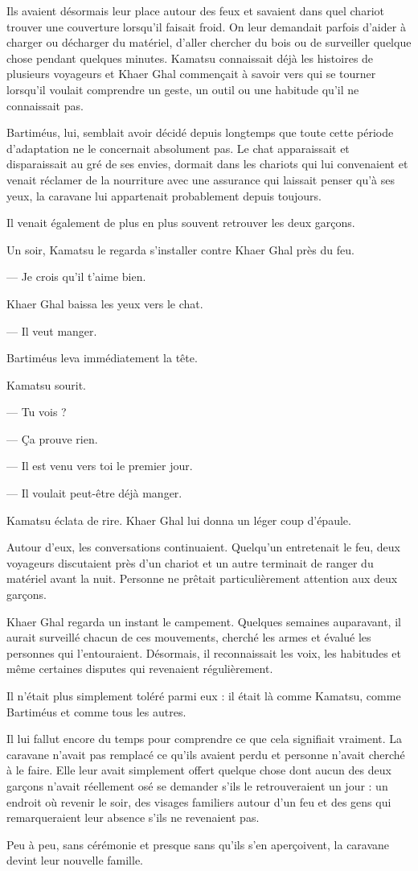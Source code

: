 Ils avaient désormais leur place autour des feux et savaient dans quel chariot
trouver une couverture lorsqu'il faisait froid. On leur demandait parfois
d'aider à charger ou décharger du matériel, d'aller chercher du bois ou de
surveiller quelque chose pendant quelques minutes. Kamatsu connaissait déjà
les histoires de plusieurs voyageurs et Khaer Ghal commençait à savoir vers
qui se tourner lorsqu'il voulait comprendre un geste, un outil ou une habitude
qu'il ne connaissait pas.

Bartiméus, lui, semblait avoir décidé depuis longtemps que toute cette période
d'adaptation ne le concernait absolument pas. Le chat apparaissait et
disparaissait au gré de ses envies, dormait dans les chariots qui lui
convenaient et venait réclamer de la nourriture avec une assurance qui
laissait penser qu'à ses yeux, la caravane lui appartenait probablement depuis
toujours.

Il venait également de plus en plus souvent retrouver les deux garçons.

Un soir, Kamatsu le regarda s'installer contre Khaer Ghal près du feu.

— Je crois qu'il t'aime bien.

Khaer Ghal baissa les yeux vers le chat.

— Il veut manger.

Bartiméus leva immédiatement la tête.

Kamatsu sourit.

— Tu vois ?

— Ça prouve rien.

— Il est venu vers toi le premier jour.

— Il voulait peut-être déjà manger.

Kamatsu éclata de rire. Khaer Ghal lui donna un léger coup d'épaule.

Autour d'eux, les conversations continuaient. Quelqu'un entretenait le feu,
deux voyageurs discutaient près d'un chariot et un autre terminait de ranger
du matériel avant la nuit. Personne ne prêtait particulièrement attention aux
deux garçons.

Khaer Ghal regarda un instant le campement. Quelques semaines auparavant, il
aurait surveillé chacun de ces mouvements, cherché les armes et évalué les
personnes qui l'entouraient. Désormais, il reconnaissait les voix, les
habitudes et même certaines disputes qui revenaient régulièrement.

Il n'était plus simplement toléré parmi eux : il était là comme Kamatsu, comme
Bartiméus et comme tous les autres.

Il lui fallut encore du temps pour comprendre ce que cela signifiait vraiment.
La caravane n'avait pas remplacé ce qu'ils avaient perdu et personne n'avait
cherché à le faire. Elle leur avait simplement offert quelque chose dont aucun
des deux garçons n'avait réellement osé se demander s'ils le retrouveraient un
jour : un endroit où revenir le soir, des visages familiers autour d'un feu et
des gens qui remarqueraient leur absence s'ils ne revenaient pas.

Peu à peu, sans cérémonie et presque sans qu'ils s'en aperçoivent, la caravane
devint leur nouvelle famille.